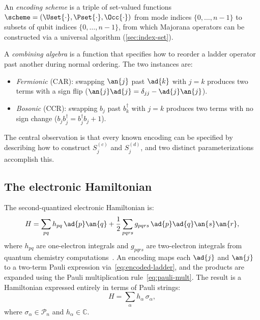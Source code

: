 \begin{definition}
\label{def:encoding-scheme}
An \emph{encoding scheme} is a triple of set-valued functions
$\scheme = (\Uset{\cdot}, \Pset{\cdot}, \Occ{\cdot})$ from mode
indices $\{0, \ldots, n{-}1\}$ to subsets of qubit indices
$\{0, \ldots, n{-}1\}$, from which Majorana operators can be
constructed via a universal algorithm (\cref{sec:index-set}).
\end{definition}

\begin{definition}
\label{def:combining-algebra}
A \emph{combining algebra} is a function that specifies how to
reorder a ladder operator past another during normal ordering.  The
two instances are:
\begin{itemize}
  \item \emph{Fermionic} (CAR): swapping $\an{j}$ past $\ad{k}$
    with $j = k$ produces two terms with a sign flip
    ($\an{j}\ad{j} = \delta_{jj} - \ad{j}\an{j}$).
  \item \emph{Bosonic} (CCR): swapping $b_j$ past $b_k^\dagger$
    with $j = k$ produces two terms with no sign change
    ($b_j b_j^\dagger = b_j^\dagger b_j + 1$).
\end{itemize}
\end{definition}

\noindent
The central observation is that every known encoding can be specified
by describing how to construct $S_j^{(c)}$ and $S_j^{(d)}$, and two
distinct parameterizations accomplish this.

\subsection{The electronic Hamiltonian}

The second-quantized electronic Hamiltonian is:
\begin{equation}
  H = \sum_{pq} h_{pq}\, \ad{p}\an{q}
    + \frac{1}{2} \sum_{pqrs} g_{pqrs}\, \ad{p}\ad{q}\an{s}\an{r},
  \label{eq:hamiltonian}
\end{equation}
where $h_{pq}$ are one-electron integrals and $g_{pqrs}$ are
two-electron integrals from quantum chemistry
computations~\cite{szabo1996, helgaker2000}.  An encoding maps each
$\ad{j}$ and $\an{j}$ to a two-term Pauli expression
via~\eqref{eq:encoded-ladder}, and the products are expanded using the
Pauli multiplication rule~\eqref{eq:pauli-mult}.  The result is a
Hamiltonian expressed entirely in terms of Pauli strings:
\begin{equation}
  H = \sum_{\alpha} h_\alpha\, \sigma_\alpha,
  \label{eq:pauli-hamiltonian}
\end{equation}
where $\sigma_\alpha \in \mathcal{P}_n$ and $h_\alpha \in \mathbb{C}$.
